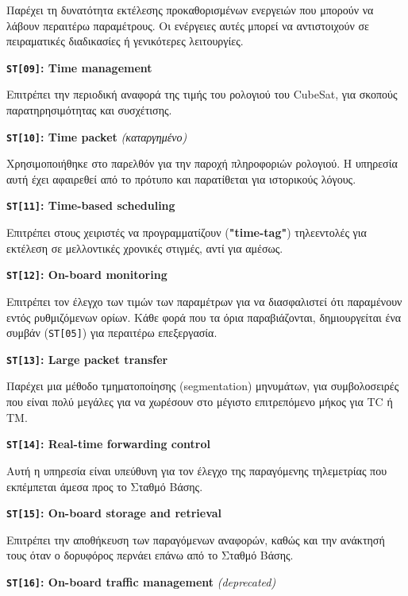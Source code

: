 \documentclass[a4paper,nobib]{tufte-book}
\begin{document}
\begin{compactitem}
		Παρέχει τη δυνατότητα εκτέλεσης προκαθορισμένων ενεργειών που μπορούν να λάβουν περαιτέρω παραμέτρους. Οι ενέργειες αυτές μπορεί να αντιστοιχούν σε πειραματικές διαδικασίες ή γενικότερες λειτουργίες.
		
		\item \textbf{\texttt{ST[09]}: Time management}
		
		Επιτρέπει την περιοδική αναφορά της τιμής του ρολογιού του CubeSat, για σκοπούς παρατηρησιμότητας και συσχέτισης.
		
		\item \textbf{\texttt{ST[10]}: Time packet} \emph{(καταργημένο)}
		
		Χρησιμοποιήθηκε στο παρελθόν για την παροχή πληροφοριών ρολογιού. Η υπηρεσία αυτή έχει αφαιρεθεί από το πρότυπο και παρατίθεται για ιστορικούς λόγους.
		
		\item \textbf{\texttt{ST[11]}: Time-based scheduling}
		
		Επιτρέπει στους χειριστές να προγραμματίζουν (\textbf{"time-tag"}) τηλεεντολές για εκτέλεση σε μελλοντικές χρονικές στιγμές, αντί για αμέσως.
		
		\item \textbf{\texttt{ST[12]}: On-board monitoring}
		
		Επιτρέπει τον έλεγχο των τιμών των παραμέτρων για να διασφαλιστεί ότι παραμένουν εντός ρυθμιζόμενων ορίων. Κάθε φορά που τα όρια παραβιάζονται, δημιουργείται ένα συμβάν (\texttt{ST[05]}) για περαιτέρω επεξεργασία.
		
		\item \textbf{\texttt{ST[13]}: Large packet transfer}
		
		Παρέχει μια μέθοδο τμηματοποίησης (segmentation) μηνυμάτων, για συμβολοσειρές που είναι πολύ μεγάλες για να χωρέσουν στο μέγιστο επιτρεπόμενο μήκος για \ac{TC} ή \ac{TM}.
		
		\item \textbf{\texttt{ST[14]}: Real-time forwarding control}
		
		Αυτή η υπηρεσία είναι υπεύθυνη για τον έλεγχο της παραγόμενης τηλεμετρίας που εκπέμπεται άμεσα προς το Σταθμό Βάσης.
		
		\item \textbf{\texttt{ST[15]}: On-board storage and retrieval}
		
		Επιτρέπει την αποθήκευση των παραγόμενων αναφορών, καθώς και την ανάκτησή τους όταν ο δορυφόρος περνάει επάνω από το Σταθμό Βάσης.
		
		\item \textbf{\texttt{ST[16]}: On-board traffic management} \emph{(deprecated)}
		

\end{compactitem}
\end{document}
